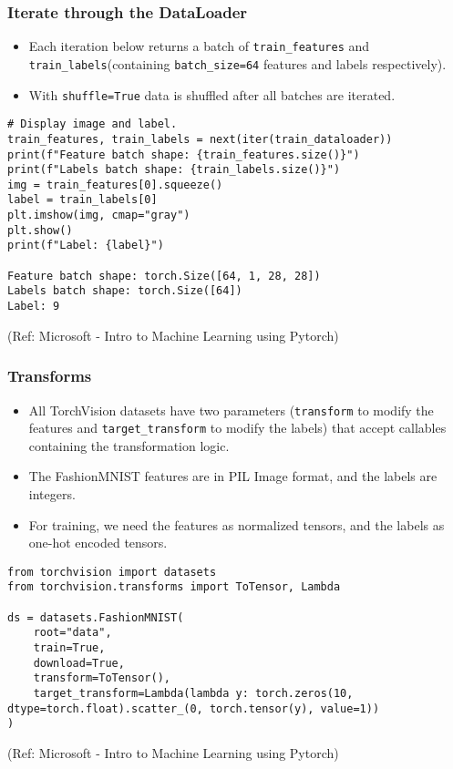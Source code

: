 \begin{frame}[fragile] \frametitle{Iterate through the DataLoader}

\begin{itemize}
\item Each iteration below returns a batch of \lstinline|train_features| and \lstinline|train_labels|(containing \lstinline|batch_size=64| features and labels respectively).
\item With \lstinline|shuffle=True| data is shuffled after all batches are iterated.
\end{itemize}

\begin{lstlisting}
# Display image and label.
train_features, train_labels = next(iter(train_dataloader))
print(f"Feature batch shape: {train_features.size()}")
print(f"Labels batch shape: {train_labels.size()}")
img = train_features[0].squeeze()
label = train_labels[0]
plt.imshow(img, cmap="gray")
plt.show()
print(f"Label: {label}")

Feature batch shape: torch.Size([64, 1, 28, 28])
Labels batch shape: torch.Size([64])
Label: 9
\end{lstlisting}

\tiny{(Ref: Microsoft - Intro to Machine Learning using Pytorch)}
\end{frame}


\begin{frame}[fragile] \frametitle{Transforms}

\begin{itemize}
\item All TorchVision datasets have two parameters (\lstinline|transform| to modify the features and \lstinline|target_transform| to modify the labels) that accept callables containing the transformation logic. 
\item The FashionMNIST features are in PIL Image format, and the labels are integers. 
\item For training, we need the features as normalized tensors, and the labels as one-hot encoded tensors.
\end{itemize}

\begin{lstlisting}
from torchvision import datasets
from torchvision.transforms import ToTensor, Lambda

ds = datasets.FashionMNIST(
    root="data",
    train=True,
    download=True,
    transform=ToTensor(),
    target_transform=Lambda(lambda y: torch.zeros(10, dtype=torch.float).scatter_(0, torch.tensor(y), value=1))
)
\end{lstlisting}

\tiny{(Ref: Microsoft - Intro to Machine Learning using Pytorch)}
\end{frame}

